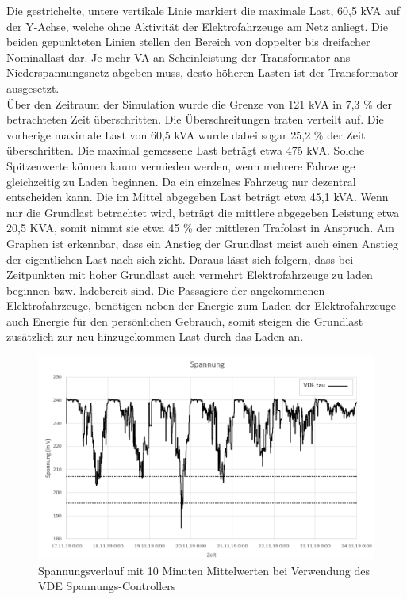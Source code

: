 Die gestrichelte, untere vertikale Linie markiert die maximale Last, 60,5 kVA auf der Y-Achse, welche ohne Aktivität der Elektrofahrzeuge am Netz anliegt. Die beiden gepunkteten Linien stellen den Bereich von doppelter bis dreifacher Nominallast dar. Je mehr VA an Scheinleistung der Transformator ans Niederspannungsnetz abgeben muss, desto höheren Lasten ist der Transformator ausgesetzt. \\
Über den Zeitraum der Simulation wurde die Grenze von 121 kVA in 7,3 \% der betrachteten Zeit überschritten. Die Überschreitungen traten verteilt auf. Die vorherige maximale Last von 60,5 kVA wurde dabei sogar 25,2 \% der Zeit überschritten. Die maximal gemessene Last beträgt etwa 475 kVA. Solche Spitzenwerte können kaum vermieden werden, wenn mehrere Fahrzeuge gleichzeitig zu Laden beginnen. Da ein einzelnes Fahrzeug nur dezentral entscheiden kann. Die im Mittel abgegeben Last beträgt etwa 45,1 kVA. Wenn nur die Grundlast betrachtet wird, beträgt die mittlere abgegeben Leistung etwa 20,5 KVA, somit nimmt sie etwa 45 \% der mittleren Trafolast in Anspruch. Am Graphen ist erkennbar, dass ein Anstieg der Grundlast meist auch einen Anstieg der eigentlichen Last nach sich zieht. Daraus lässt sich folgern, dass bei Zeitpunkten mit hoher Grundlast auch vermehrt Elektrofahrzeuge zu laden beginnen bzw. ladebereit sind. Die Passagiere der angekommenen Elektrofahrzeuge, benötigen neben der Energie zum Laden der Elektrofahrzeuge auch Energie für den persönlichen Gebrauch, somit steigen die Grundlast zusätzlich zur neu hinzugekommen Last durch das Laden an. \\
\begin{figure}[htb]
\centering
	\includegraphics[scale=0.7]{img/VDE_tau/Spannung10m3.png}
	\caption{Spannungsverlauf mit 10 Minuten Mittelwerten bei Verwendung des VDE Spannungs-Controllers}
	\label{Abb_VDEtauSpannung10m}
\end{figure}

